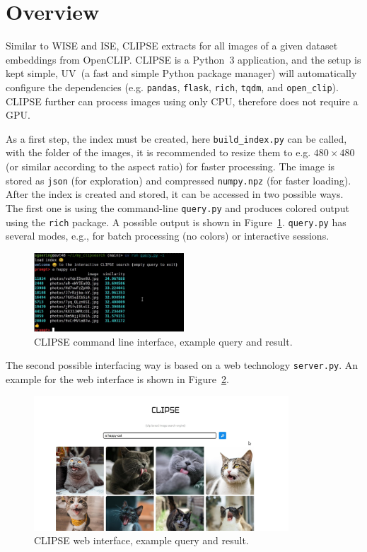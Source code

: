 \documentclass{article}
\begin{document}
\section{Overview}
Similar to WISE and ISE, CLIPSE extracts for all images of a given dataset embeddings from OpenCLIP.
CLIPSE is a Python~3 application, and the setup is kept simple, UV~\cite{uv}(a fast and simple Python package manager) will automatically configure the dependencies (e.g. \texttt{pandas}, \texttt{flask}, \texttt{rich}, \texttt{tqdm}, and \texttt{open\_clip}).
CLIPSE further can process images using only CPU, therefore does not require a GPU.

As a first step, the index must be created, here \lstinline[language={bash}]{build_index.py} can be called, with the folder of the images, it is recommended to resize them to e.g. $480\times480$ (or similar according to the aspect ratio) for faster processing.
The image is stored as \texttt{json} (for exploration) and compressed \lstinline[language={python}]{numpy.npz} (for faster loading).
After the index is created and stored, it can be accessed in two possible ways.
The first one is using the command-line \lstinline[language={bash}]{query.py} and produces colored output using the \texttt{rich} package.
A possible output is shown in Figure~\ref{fig:cli}.
\lstinline[language={bash}]{query.py} has several modes, e.g., for batch processing (no colors) or interactive sessions.

\begin{figure}
\centering
\includegraphics[width=0.5\textwidth]{CLI.jpg}
\caption{CLIPSE command line interface, example query and result.}
\label{fig:cli}
\end{figure}

The second possible interfacing way is based on a web technology \lstinline[language={bash}]{server.py}.
An example for the web interface is shown in Figure~\ref{fig:web}.

\begin{figure}
\centering
\includegraphics[width=0.85\textwidth]{WEB.jpg}
\caption{CLIPSE web interface, example query and result.}
\label{fig:web}
\end{figure}
\end{document}
